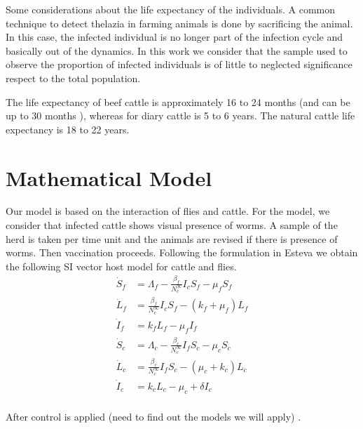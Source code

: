 \documentclass[preprint,12pt]{elsarticle}
\begin{document}
    Some considerations about the life expectancy of the individuals. A common 
technique to detect thelazia in farming animals is done by sacrificing the 
animal. In this case, the infected individual is no longer part of the 
infection cycle and basically out of the dynamics.
In this work we consider that the sample used to observe the proportion of 
infected individuals is of little to neglected significance respect to the 
total population.

The life expectancy of beef cattle is approximately 16 to 24 months (and can be 
up to 30 months \cite{stanley:2003}), whereas for diary cattle is 5 to 6 years. 
The natural cattle life expectancy is 18 to 22 years.

\section{Mathematical Model}

        Our model is based on the interaction of flies and cattle. For the 
    model, we consider that infected cattle shows visual presence of worms. A 
    sample of the herd is taken per time unit and the animals are revised if 
    there is presence of worms. Then vaccination proceeds.  
    Following the formulation in Esteva \cite{Esteva:1998} we obtain the 
    following SI vector host model for cattle and flies.
%
%
\begin{equation}\label{Eq:SIvectorhostmodel}
\begin{aligned}
    \dot{S}_f&= 
        \Lambda_f-\frac{\beta_f}{N_c^{\infty}}I_cS_f-\mu_fS_f
    \\
    \dot{L}_f&= 
        \frac{\beta_f}{N_c^{\infty}}I_cS_f-\left(k_f+\mu_f\right)L_f
    \\
    \dot{I}_f&= 
        k_f L_f-\mu_fI_f
    \\
    \dot{S}_c&= 
        \Lambda_c-\frac{\beta_c}{N_c^{\infty}}I_fS_c-\mu_cS_c
    \\
    \dot{L}_c&= 
        \frac{\beta_c}{N_c^{\infty}}I_fS_c-\left(\mu_c+k_c\right)L_c
    \\
    \dot{I}_c&= k_c L_c-\mu_c +\delta I_c
    \\
\end{aligned}
\end{equation}

    After control is applied (need to find out the models we will apply)
\cite{manjunath2016prevalence}.
\end{document}
